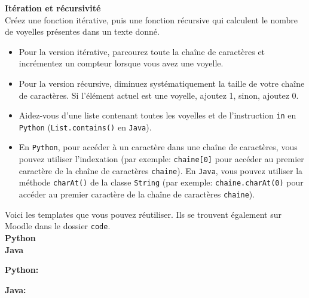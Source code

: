 \begin{Exercice}[15 minutes]\textbf{Itération et récursivité} \\
Créez une fonction itérative, puis une fonction récursive qui calculent le nombre de voyelles présentes dans un texte donné. \\

\begin{conseil}
    \begin{itemize}
        \item Pour la version itérative, parcourez toute la chaîne de caractères et incrémentez un compteur lorsque vous avez une voyelle.
        \item Pour la version récursive, diminuez systématiquement la taille de votre chaîne de caractères. Si l'élément actuel est une voyelle, ajoutez 1, sinon, ajoutez 0.
        \item Aidez-vous d'une liste contenant toutes les voyelles et de l'instruction \lstinline{in} en \lstinline{Python} (\lstinline{List.contains()} en \lstinline{Java}).
        \item En \lstinline{Python}, pour accéder à un caractère dans une chaîne de caractères, vous pouvez utiliser l'indexation (par exemple: \lstinline{chaine[0]} pour accéder au premier caractère de la chaîne de caractères \lstinline{chaine}). En \lstinline{Java}, vous pouvez utiliser la méthode \lstinline{charAt()} de la classe \lstinline{String} (par exemple: \lstinline{chaine.charAt(0)} pour accéder au premier caractère de la chaîne de caractères \lstinline{chaine}).
    \end{itemize}
\end{conseil}

Voici les templates que vous pouvez réutiliser. Ils se trouvent également sur Moodle dans le dossier \lstinline{code}. \\

\textbf{Python} \\
     

\textbf{Java} \\
    

    
\begin{solution}
\textbf{Python:} \\
    
    
\end{solution}


\begin{solution}   
\textbf{Java:} \\

    
    
    
    
\end{solution}

\end{Exercice}

